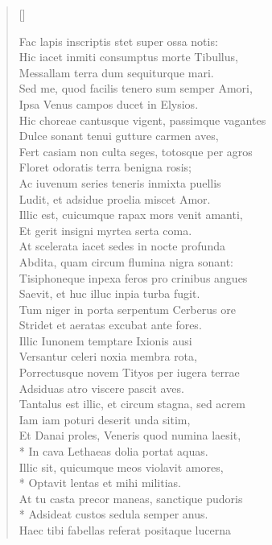 \begin{verse}[\versewidth]
\begin{altverse}
{Fac lapis inscriptis stet super ossa notis:\\
Hic iacet inmiti consumptus morte Tibullus,\\
Messallam terra dum sequiturque mari.\\
Sed me, quod facilis tenero sum semper Amori,\\
Ipsa Venus campos ducet in Elysios.\\
Hic choreae cantusque vigent, passimque vagantes\\
Dulce sonant tenui gutture carmen aves,\\
Fert casiam non culta seges, totosque per agros\\
Floret odoratis terra benigna rosis;\\
Ac iuvenum series teneris inmixta puellis\\
Ludit, et adsidue proelia miscet Amor.\\
Illic est, cuicumque rapax mors venit amanti,\\
Et gerit insigni myrtea serta coma.\\
At scelerata iacet sedes in nocte profunda\\
Abdita, quam circum flumina nigra sonant:\\
Tisiphoneque inpexa feros pro crinibus angues\\
Saevit, et huc illuc inpia turba fugit.\\
Tum niger in porta serpentum Cerberus ore\\
Stridet et aeratas excubat ante fores.\\
Illic Iunonem temptare Ixionis ausi\\
Versantur celeri noxia membra rota,\\
Porrectusque novem Tityos per iugera terrae\\
Adsiduas atro viscere pascit aves.\\
Tantalus est illic, et circum stagna, sed acrem\\
Iam iam poturi deserit unda sitim,\\
Et Danai proles, Veneris quod numina laesit,\\*
In cava Lethaeas dolia portat aquas.\\
Illic sit, quicumque meos violavit amores,\\*
Optavit lentas et mihi militias.\\
At tu casta precor maneas, sanctique pudoris\\*
Adsideat custos sedula semper anus.\\
Haec tibi fabellas referat positaque lucerna\\
}
\end{altverse}
\end{verse}
